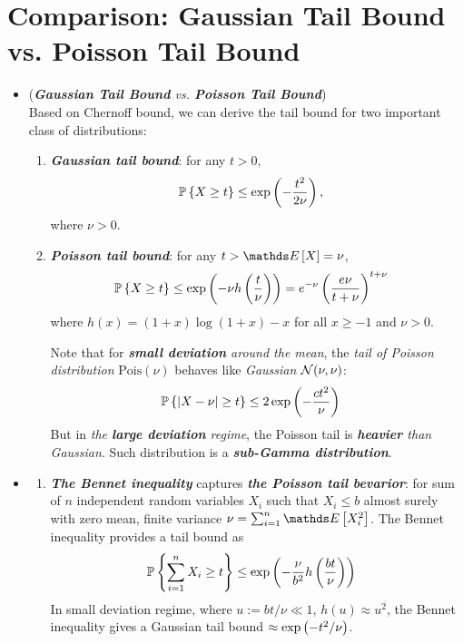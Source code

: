 \documentclass[11pt]{article}
\begin{document}
\section{Comparison: Gaussian Tail Bound vs. Poisson Tail Bound}
\begin{itemize}
\item \begin{remark} (\emph{\textbf{Gaussian Tail Bound} vs. \textbf{Poisson Tail Bound}})\\
Based on Chernoff bound, we can derive the tail bound for two important class of distributions: 
\begin{enumerate}
\item \emph{\textbf{Gaussian tail bound}}: for any $t > 0$, 
\begin{align*}
{\mathbb P}\left\{X \ge t\right\} &\le \exp\left(-\frac{t^2}{2 \nu}\right),
\end{align*} where $\nu >0$.
\item \emph{\textbf{Poisson tail bound}}:  for any $t > \E{}{X} = \nu$,
\begin{align*}
{\mathbb P}\left\{X \ge t\right\} &\le \exp\left(-  \nu h\left(\frac{t}{\nu}\right)\right) = e^{-\nu}\left(\frac{e \nu}{t + \nu}\right)^{t+\nu}
\end{align*} where $h(x) = (1 + x) \log(1 + x) - x$ for all  $x \ge -1$ and $\nu >0$.

Note that for \emph{\textbf{small deviation} around the mean}, the \emph{tail of Poisson distribution} $\text{Pois}(\nu)$ behaves like \emph{Gaussian} ${\mathcal N}(\nu, \nu)$:
\begin{align*}
{\mathbb P}\left\{\left\lvert X - \nu \right\rvert \ge t\right\}& \le 2\exp\left(- \frac{c t^2}{\nu}\right)
\end{align*}
But in \emph{the \textbf{large deviation} regime}, the Poisson tail is \emph{\textbf{heavier} than Gaussian}. Such distribution is a \emph{\textbf{sub-Gamma distribution}}. 
\end{enumerate}
\end{remark}

\item \begin{remark}
\begin{enumerate}
\item \emph{\textbf{The Bennet inequality}} captures \emph{\textbf{the Poisson tail bevarior}}:  for sum of  $n$ independent random variables $X_i$ such that $X_i \le b$ almost surely with zero mean, finite variance $\nu = \sum_{i=1}^n \E{}{X_i^2}$.  The Bennet inequality provides a tail bound as
\begin{align*}
{\mathbb P}\left\{\sum_{i=1}^n X_i \ge t\right\} &\le \exp\left(-  \frac{\nu}{b^2} h\left(\frac{b t}{\nu}\right)\right)
\end{align*} In small deviation regime, where $u:= bt/\nu \ll 1$, $h(u) \approx u^2$, the Bennet inequality gives a Gaussian tail bound $\approx \exp\left(- t^2/\nu\right)$.


\end{enumerate}
\end{remark}
\end{itemize}
\end{document}
